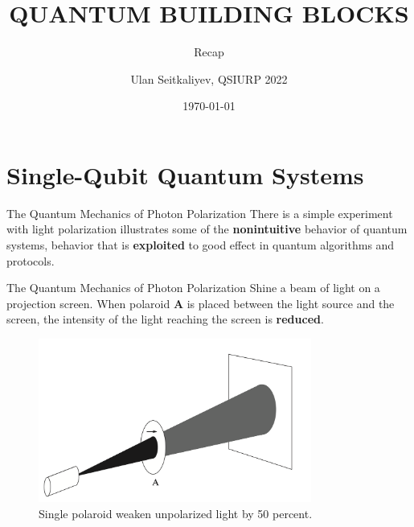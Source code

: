 \documentclass[10pt]{beamer}
\title{QUANTUM BUILDING BLOCKS}
\subtitle{Recap}
\date{\today}
\author{Ulan Seitkaliyev, QSIURP 2022}
\institute{Carnegie Mellon University in Qatar}
\begin{document}
\maketitle


\section[Single-Qubit Quantum Systems]{Single-Qubit Quantum Systems}

\begin{frame}[fragile]{The Quantum Mechanics of Photon Polarization}
    There is a simple experiment with light polarization illustrates some of the \textbf{nonintuitive} behavior of quantum systems, behavior that is \textbf{exploited} to good effect in quantum algorithms and protocols. 

\end{frame}

\begin{frame}[fragile]{The Quantum Mechanics of Photon Polarization}
    Shine a beam of light on a projection screen. When polaroid \textbf{A} is placed between the light source and the screen, the intensity of the light reaching the screen is \textbf{reduced}.
    
    \begin{figure}[htbp]
          \centering
          \includegraphics[width=0.8\textwidth]{h.png}
          \caption{Single polaroid weaken unpolarized light by 50 percent.}
    \end{figure}
    
\end{frame}
\end{document}

